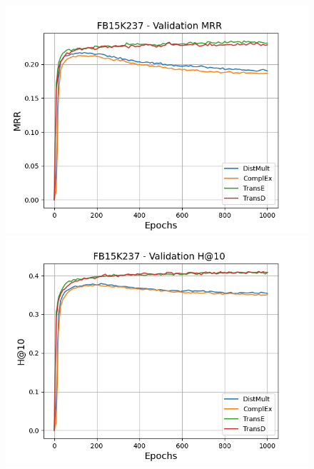 \begin{figure}[H]
    \centering
    \begin{minipage}{.3\textwidth}
      \centering
      \includegraphics[width=\linewidth]{figures/results/pretrain/fb15k237/pretrain_fb15k237_mrrs.png}
    \end{minipage}%
    \begin{minipage}{.3\textwidth}
      \centering
      \includegraphics[width=\linewidth]{figures/results/pretrain/fb15k237/pretrain_fb15k237_hit10.png}
    \end{minipage}
    \begin{minipage}{.3\textwidth}
      \centering

\end{minipage}
\end{figure}
